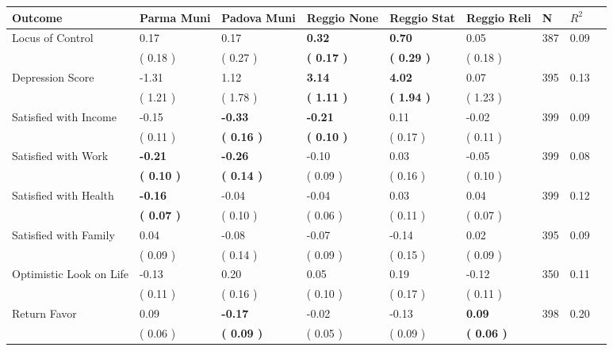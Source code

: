 \begin{tabular}{L{6.2cm} C{1.8cm} C{1.8cm} C{1.8cm} C{1.8cm} C{1.8cm} C{1.8cm} C{0.3cm} C{0.3cm}}
\toprule
 \textbf{Outcome} & \textbf{Parma Muni} & \textbf{Padova Muni} & \textbf{Reggio None} & \textbf{Reggio Stat} & \textbf{Reggio Reli} & \textbf{N} & \textbf{$ R^2$} \\
\midrule
Locus of Control &      0.17 &      0.17 & \textbf{     0.32} & \textbf{     0.70} &      0.05  & 387 &       0.09 \\ 
 & (     0.18 ) & (     0.27 ) & \textbf{(     0.17 )} & \textbf{(     0.29 )} & (     0.18 )  & \\
Depression Score &     -1.31 &      1.12 & \textbf{     3.14} & \textbf{     4.02} &      0.07  & 395 &       0.13 \\ 
 & (     1.21 ) & (     1.78 ) & \textbf{(     1.11 )} & \textbf{(     1.94 )} & (     1.23 )  & \\
Satisfied with Income &     -0.15 & \textbf{    -0.33} & \textbf{    -0.21} &      0.11 &     -0.02  & 399 &       0.09 \\ 
 & (     0.11 ) & \textbf{(     0.16 )} & \textbf{(     0.10 )} & (     0.17 ) & (     0.11 )  & \\
Satisfied with Work & \textbf{    -0.21} & \textbf{    -0.26} &     -0.10 &      0.03 &     -0.05  & 399 &       0.08 \\ 
 & \textbf{(     0.10 )} & \textbf{(     0.14 )} & (     0.09 ) & (     0.16 ) & (     0.10 )  & \\
Satisfied with Health & \textbf{    -0.16} &     -0.04 &     -0.04 &      0.03 &      0.04  & 399 &       0.12 \\ 
 & \textbf{(     0.07 )} & (     0.10 ) & (     0.06 ) & (     0.11 ) & (     0.07 )  & \\
Satisfied with Family &      0.04 &     -0.08 &     -0.07 &     -0.14 &      0.02  & 395 &       0.09 \\ 
 & (     0.09 ) & (     0.14 ) & (     0.09 ) & (     0.15 ) & (     0.09 )  & \\
Optimistic Look on Life &     -0.13 &      0.20 &      0.05 &      0.19 &     -0.12  & 350 &       0.11 \\ 
 & (     0.11 ) & (     0.16 ) & (     0.10 ) & (     0.17 ) & (     0.11 )  & \\
Return Favor &      0.09 & \textbf{    -0.17} &     -0.02 &     -0.13 & \textbf{     0.09}  & 398 &       0.20 \\ 
 & (     0.06 ) & \textbf{(     0.09 )} & (     0.05 ) & (     0.09 ) & \textbf{(     0.06 )}  & \\

\end{tabular}
